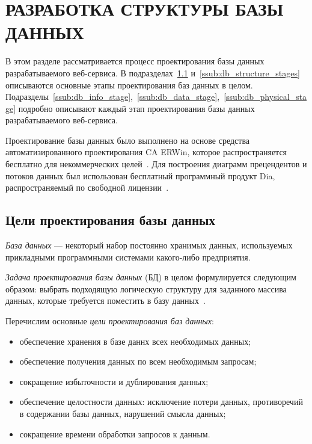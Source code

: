 \section[Разработка структуры БД]{РАЗРАБОТКА СТРУКТУРЫ БАЗЫ ДАННЫХ}
\label{sub:db_structure}

В этом разделе рассматривается процесс проектирования базы данных разрабатываемого
веб-сервиса.
В подразделах~\ref{ssub:db_structure_aims} и~\ref{ssub:db_structure_stages} описываются
основные этапы проектирования баз данных в целом.
Подразделы~\ref{ssub:db_info_stage},~\ref{ssub:db_data_stage},~\ref{ssub:db_physical_stage}
подробно описывают каждый этап проектирования базы данных разрабатываемого веб-сервиса.

Проектирование базы данных было выполнено на основе средства автоматизированного
проектирования CA ERWin, которое распространяется бесплатно для некоммерческих целей~\cite{er_win_license}.
Для построения диаграмм прецендентов и потоков данных был использован бесплатный
программный продукт Dia, распространяемый по свободной лицензии~\cite{dia_license}.

\subsection{Цели проектирования базы данных}
\label{ssub:db_structure_aims}

\textit{База данных} --- некоторый набор постоянно хранимых данных,
используемых прикладными программными системами какого-либо предприятия.

\textit{Задача проектирования базы данных} (БД) в целом формулируется
следующим образом: выбрать подходящую логическую структуру для заданного
массива данных, которые требуется поместить в базу данных~\cite{date05}.

Перечислим основные \textit{цели проектирования баз данных}:
\begin{itemize}
\item
  обеспечение хранения в базе даннх всех необходимых данных;
\item
  обеспечение получения данных по всем необходимым запросам;
\item
  сокращение избыточности и дублирования данных;
\item
  обеспечение целостности данных: исключение потери данных, противоречий в
  содержании базы данных, нарушений смысла данных;
\item
  сокращение времени обработки запросов к данным.
\end{itemize}

